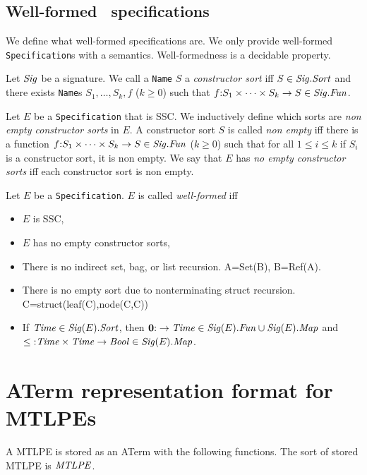 \documentclass[fleqn,a4paper,dvips]{article}
\newcommand{\Sig}{\nm{Sig}}
\newcommand{\Fun}{\nm{Fun}}
\newcommand{\nul}{{\bf 0}}
\begin{document}
{\subsection{Well-formed \mcrl\ specifications}
We define what well-formed specifications are. We only provide
well-formed {\tt Specification}s with a semantics. Well-formedness
is a decidable property.
\begin{defn}
Let $\Sig$ be a signature. We call a {\tt Name} $S$ a {\it constructor sort}
iff $S\in\Sig.\Sort$ and there exists {\tt Name}s $S_1,\ldots, S_k, f$ ($k\geq 0$)
such that $f\ap S_1\times \cdots\times S_k\rightarrow S\in \Sig.\Fun$.
\end{defn}
\begin{defn}
Let $E$ be a {\tt Specification} that is SSC. 
We inductively define which sorts are {\it non empty constructor sorts} in $E$.
A constructor sort $S$ is called {\it non empty} iff there is a function
$f\ap S_1\times\cdots\times S_k\rightarrow S\in \Sig.\Fun$ ($k\geq 0$) such
that for all $1\leq i\leq k$ if $S_i$ is a constructor sort, it is non empty.
We say
that $E$ has {\em no empty constructor sorts} iff each constructor sort is non
empty.
\end{defn}
\begin{defn}
Let $E$ be a {\tt Specification}. $E$ is called {\it well-formed} iff 
\begin{itemize}
\item $E$ is SSC, 
\item $E$ has no empty constructor sorts,
\item There is no indirect set, bag, or list recursion. A=Set(B), B=Ref(A).
\item There is no empty sort due to nonterminating struct recursion.
  C=struct(leaf(C),node(C,C))
\item If $\Time\in\Sig(E).\Sort$, then $\nul\ap \rightarrow\Time\in\Sig(E).\Fun\cup \Sig(E).\Map$
  and $\leq\ap\Time\times\Time\rightarrow\Bool\in \Sig(E).\Map$.
\end{itemize}
\end{defn}

\newpage
\section{ATerm representation format for MTLPEs}
A MTLPE is stored as an ATerm with the following functions. The sort
of stored MTLPE is $\mathit{MTLPE}$.

}
\end{document}
